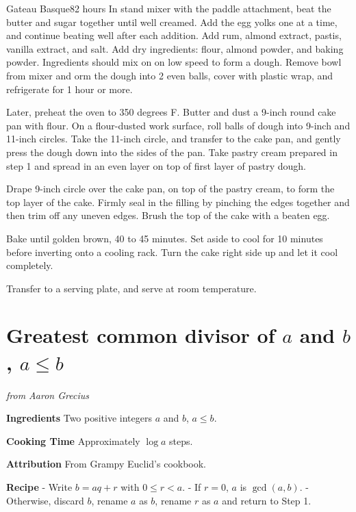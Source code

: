 \documentclass[openany]{book}
\begin{document}
\begin{recipe}{Gateau Basque}{8}{2 hours}
In stand mixer with the paddle attachment, beat the butter and sugar together until well creamed. Add the egg yolks one at a time, and continue beating well after each addition. Add rum, almond extract, pastis, vanilla extract, and salt. Add dry ingredients: flour, almond powder, and baking powder. Ingredients should mix on on low speed to form a dough. Remove bowl from mixer and orm the dough into 2 even balls, cover with plastic wrap, and refrigerate for 1 hour or more.\par
Later, preheat the oven to 350 degrees F. Butter and dust a 9-inch round cake pan with flour. On a flour-dusted work surface, roll balls of dough into 9-inch and 11-inch circles. Take the 11-inch circle, and transfer to the cake pan, and gently press the dough down into the sides of the pan. Take pastry cream prepared in step 1 and spread in an even layer on top of first layer of pastry dough.\par
Drape 9-inch circle over the cake pan, on top of the pastry cream, to form the top layer of the cake. Firmly seal in the filling by pinching the edges together and then trim off any uneven edges. Brush the top of the cake with a beaten egg.\par
Bake until golden brown, 40 to 45 minutes. Set aside to cool for 10 minutes before inverting onto a cooling rack. Turn the cake right side up and let it cool completely.

\freeform Transfer to a serving plate, and serve at room temperature.
\end{recipe}

\chapter{\texorpdfstring{Greatest common divisor of \(a\) and \(b\),
\(a\leq b\)}{Greatest common divisor of a and b, a\textbackslash{}leq b}}\label{greatest-common-divisor-of-a-and-b-aleq-b}

\emph{from Aaron Grecius}

\textbf{Ingredients} Two positive integers \(a\) and \(b\), \(a\leq b\).

\textbf{Cooking Time} Approximately \(\log a\) steps.

\textbf{Attribution} From Grampy Euclid's cookbook.

\textbf{Recipe} - Write \(b=aq+r\) with \(0\leq r<a\). - If \(r=0\),
\(a\) is \(\gcd(a,b)\). - Otherwise, discard \(b\), rename \(a\) as
\(b\), rename \(r\) as \(a\) and return to Step 1.
\end{document}

